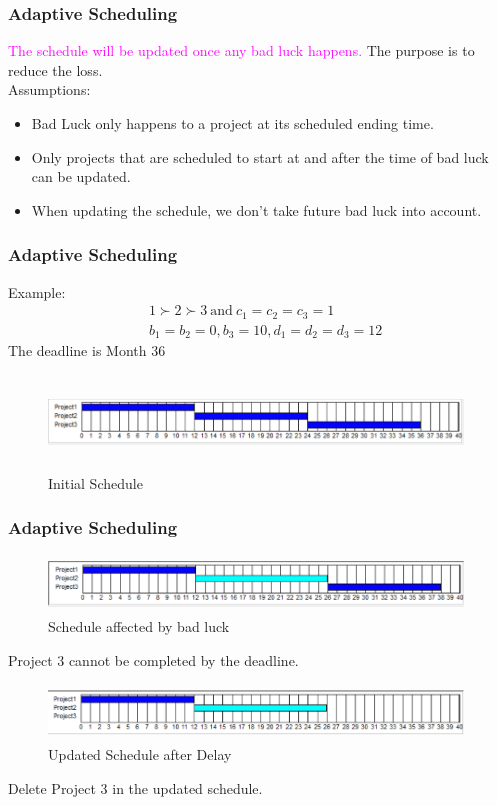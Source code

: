 \documentclass{beamer}
\newcommand{\tmag}{\textcolor{magenta}}
\begin{document}
\begin{frame}
\frametitle{Adaptive Scheduling}
\tmag{The schedule will be updated once any bad luck happens.}
The purpose is to reduce the loss. \\
\bigskip
Assumptions:
\begin{itemize}
\item Bad Luck only happens to a project at its scheduled ending time.
\medskip
\item Only projects that are scheduled to start at and after the time of bad luck can be updated.
\medskip
\item When updating the schedule, we don't take future bad luck into account.
\end{itemize}
\end{frame}

\begin{frame}
\frametitle{Adaptive Scheduling}
Example:
\begin{displaymath}
\begin{array}{ll}
&1\succ 2\succ 3~\mbox{and}~c_1=c_2=c_3=1\\
&b_1=b_2=0, b_3=10, d_1=d_2=d_3=12
\end{array}
\end{displaymath}
The deadline is Month 36
\begin{figure}
\includegraphics[scale=0.35, width=11cm, height=2.5cm]{Adapt1.png}
\caption{Initial Schedule}
\end{figure}
\end{frame}



\begin{frame}
\frametitle{Adaptive Scheduling}
\begin{figure}
\includegraphics[scale=0.35, width=11cm, height=1.5cm]{Adapt2.png}
\caption{Schedule affected by bad luck}
\end{figure}
Project 3 cannot be completed by the deadline.
\begin{figure}
\includegraphics[scale=0.35, width=11cm, height=1.5cm]{Adapt3.png}
\caption{Updated Schedule after Delay}
\end{figure}
Delete Project 3 in the updated schedule.
\end{frame}
\end{document}
